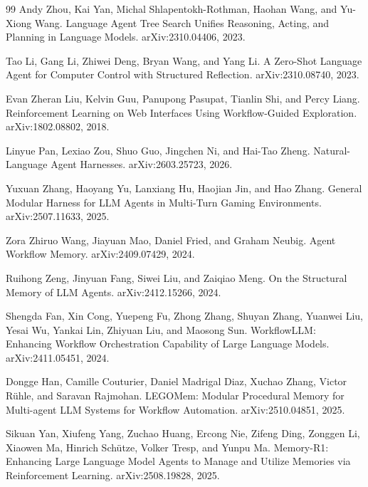\documentclass{article}
\begin{document}
\begin{thebibliography}{99}
Andy Zhou, Kai Yan, Michal Shlapentokh-Rothman, Haohan Wang, and Yu-Xiong Wang.
\newblock Language Agent Tree Search Unifies Reasoning, Acting, and Planning in Language Models.
\newblock arXiv:2310.04406, 2023.

Tao Li, Gang Li, Zhiwei Deng, Bryan Wang, and Yang Li.
\newblock A Zero-Shot Language Agent for Computer Control with Structured Reflection.
\newblock arXiv:2310.08740, 2023.

Evan Zheran Liu, Kelvin Guu, Panupong Pasupat, Tianlin Shi, and Percy Liang.
\newblock Reinforcement Learning on Web Interfaces Using Workflow-Guided Exploration.
\newblock arXiv:1802.08802, 2018.

Linyue Pan, Lexiao Zou, Shuo Guo, Jingchen Ni, and Hai-Tao Zheng.
\newblock Natural-Language Agent Harnesses.
\newblock arXiv:2603.25723, 2026.

Yuxuan Zhang, Haoyang Yu, Lanxiang Hu, Haojian Jin, and Hao Zhang.
\newblock General Modular Harness for LLM Agents in Multi-Turn Gaming Environments.
\newblock arXiv:2507.11633, 2025.

Zora Zhiruo Wang, Jiayuan Mao, Daniel Fried, and Graham Neubig.
\newblock Agent Workflow Memory.
\newblock arXiv:2409.07429, 2024.

Ruihong Zeng, Jinyuan Fang, Siwei Liu, and Zaiqiao Meng.
\newblock On the Structural Memory of LLM Agents.
\newblock arXiv:2412.15266, 2024.

Shengda Fan, Xin Cong, Yuepeng Fu, Zhong Zhang, Shuyan Zhang, Yuanwei Liu, Yesai Wu, Yankai Lin, Zhiyuan Liu, and Maosong Sun.
\newblock WorkflowLLM: Enhancing Workflow Orchestration Capability of Large Language Models.
\newblock arXiv:2411.05451, 2024.

Dongge Han, Camille Couturier, Daniel Madrigal Diaz, Xuchao Zhang, Victor R\"uhle, and Saravan Rajmohan.
\newblock LEGOMem: Modular Procedural Memory for Multi-agent LLM Systems for Workflow Automation.
\newblock arXiv:2510.04851, 2025.

Sikuan Yan, Xiufeng Yang, Zuchao Huang, Ercong Nie, Zifeng Ding, Zonggen Li, Xiaowen Ma, Hinrich Sch\"utze, Volker Tresp, and Yunpu Ma.
\newblock Memory-R1: Enhancing Large Language Model Agents to Manage and Utilize Memories via Reinforcement Learning.
\newblock arXiv:2508.19828, 2025.


\end{thebibliography}
\end{document}
